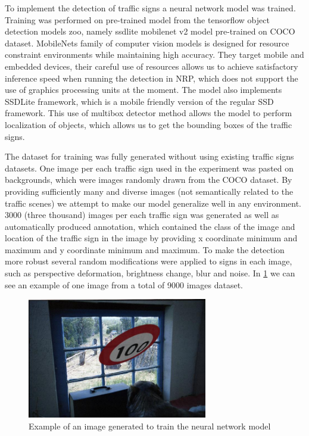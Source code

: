 To implement the detection of traffic signs a neural network model was trained. Training was performed on pre-trained model from the tensorflow object detection models zoo, namely ssdlite mobilenet v2 model pre-trained on COCO dataset\cite{DBLP:journals/corr/HuangRSZKFFWSG016}. MobileNets family of computer vision models is designed for resource constraint environments while maintaining high accuracy. They target mobile and embedded devices, their careful use of resources allows us to achieve satisfactory inference speed when running the detection in NRP, which does not support the use of graphics processing units at the moment. The model also implements SSDLite framework, which is a mobile friendly version of the regular SSD framework\cite{DBLP:journals/corr/abs-1801-04381}. This use of multibox detector method allows the model to perform localization of objects, which allows us to get the bounding boxes of the traffic signs. 


The dataset for training was fully generated without using existing traffic signs datasets. One image per each traffic sign used in the experiment was pasted on backgrounds, which were images randomly drawn from the COCO dataset. By providing sufficiently many and diverse images (not semantically related to the traffic scenes) we attempt to make our model generalize well in any environment. 3000 (three thousand) images per each traffic sign was generated as well as automatically produced annotation, which contained the class of the image and location of the traffic sign in the image by providing x coordinate minimum and maximum and y coordinate minimum and maximum. To make the detection more robust several random modifications were applied to signs in each image, such as perspective deformation, brightness change, blur and noise. In \ref{fig:img} we can see an example of one image from a total of 9000 images dataset.

\begin{figure}
  \centering
  \includegraphics[width=0.7\textwidth]{chapter/images/img-2.jpg}
  \caption{Example of an image generated to train the neural network model}
  \label{fig:img}
\end{figure}


